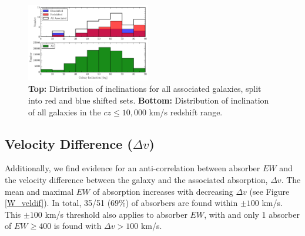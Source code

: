 \documentclass[iop]{emulateapj-rtx4}
\begin{document}
\begin{figure}[h!]
        \centering
        \includegraphics[width=0.48\textwidth]{hist(fancy_inclination)_red_blue_full_all.pdf}
        \caption{\small{\textbf{Top: }Distribution of inclinations for all associated galaxies, split into red and blue shifted sets. \textbf{Bottom:} Distribution of inclination of all galaxies in the $cz \leq 10,000$ km/s redshift range.}}
        \label{hist_inc}
        \vspace{2pt}
\end{figure}

\subsection{Velocity Difference \rm($\Delta v$\rm)}

Additionally, we find evidence for an anti-correlation between absorber $EW$ and the velocity difference between the galaxy and the associated absorption, $\Delta v$. The mean and maximal $EW$ of absorption increases with decreasing $\Delta v$ (see Figure \ref{W_veldif}). In total, 35/51 ($69\%$) of absorbers are found within $\pm100$ km/s. This $\pm100$ km/s threshold also applies to absorber $EW$, with and only 1 absorber of $EW \geq 400$ is found with $\Delta v > 100$ km/s. 

\vspace{5pt}

% 
  
\end{document}
